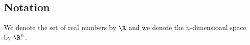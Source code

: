 
\sbasic


















\sstart
{}




\subsection{Notation}

We denote the set of real
numbers by $\R$ and we denote
the $n$-dimensioanl space by $\R^n$.

\strats
